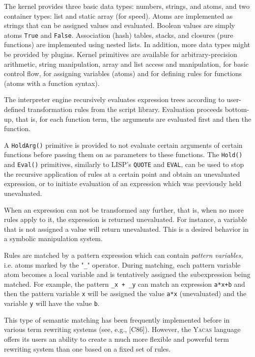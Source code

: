 \documentclass{llncs}
\begin{document}
The kernel provides three basic data types: numbers,
strings, and atoms, and two container types: list and static array (for speed).
Atoms are implemented as strings that can be assigned values and evaluated.
Boolean values are simply atoms \texttt{True} and \texttt{False}. Association (hash) tables,
stacks, and closures (pure functions) are implemented using nested lists. In
addition, more data types might be provided by plugins. Kernel primitives are
available for arbitrary-precision arithmetic, string manipulation, array and
list access and manipulation, for basic control flow, for assigning variables (atoms) and for defining rules for functions (atoms with a function syntax).


The interpreter engine recursively evaluates expression trees according to
user-defined transformation rules from the script library.
Evaluation proceeds bottom-up, that is, for each function term, the arguments are evaluated first and then the function.


A \texttt{HoldArg()} primitive is provided to not evaluate certain arguments of
certain functions before passing them on as parameters to these functions. The
\texttt{Hold()} and \texttt{Eval()} primitives, similarly to LISP's \texttt{QUOTE} and \texttt{EVAL}, can
be used to stop the recursive application of rules at a certain point and
obtain an unevaluated expression, or to initiate evaluation of an expression
which was previously held unevaluated.


When an expression can not be transformed any further, that is, when no more rules apply to it, the expression is returned
unevaluated. For instance, a variable that is not assigned a value will
return unevaluated. This is a desired behavior in a symbolic manipulation
system.


Rules are matched by a pattern expression which can contain \emph{pattern variables}, i.e. atoms marked by the "\verb|_|" operator. During matching, each pattern variable atom becomes a local variable and is tentatively assigned the subexpression being matched. For example, the pattern \verb|_x + _y| can match an expression \texttt{a*x+b} and then the pattern variable \texttt{x} will be assigned the value \texttt{a*x} (unevaluated) and the variable \texttt{y} will have the value \texttt{b}.


This type of semantic matching has been frequently implemented before in
various term rewriting systems (see, e.g., [C86]). However, the \textsc{Yacas} language
offers its users an ability to create a much more flexible and powerful term
rewriting system than one based on a fixed set of rules.
\end{document}
